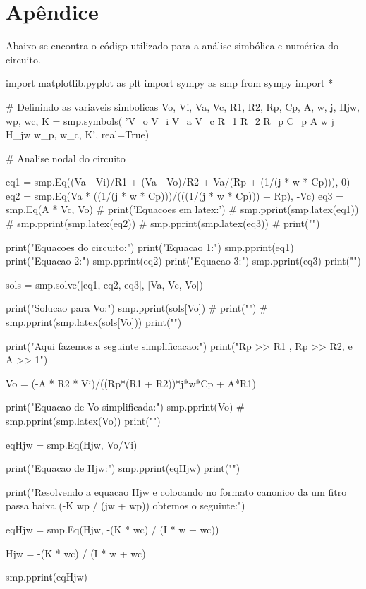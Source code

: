 \section{Apêndice}

Abaixo se encontra o código utilizado para a análise simbólica e numérica do circuito.

\begin{python}
    import matplotlib.pyplot as plt
    import sympy as smp
    from sympy import *

    # Definindo as variaveis simbolicas
    Vo, Vi, Va, Vc, R1, R2, Rp, Cp, A, w, j, Hjw, wp, wc, K = smp.symbols(
    'V_o V_i V_a V_c R_1 R_2 R_p C_p A w j H_jw w_p, w_c, K', real=True)

    # Analise nodal do circuito

    eq1 = smp.Eq((Va - Vi)/R1 + (Va - Vo)/R2 + Va/(Rp + (1/(j * w * Cp))), 0)
    eq2 = smp.Eq(Va * ((1/(j * w * Cp)))/(((1/(j * w * Cp))) + Rp), -Vc)
    eq3 = smp.Eq(A * Vc, Vo)
    # print('Equacoes em latex:')
    # smp.pprint(smp.latex(eq1))
    # smp.pprint(smp.latex(eq2))
    # smp.pprint(smp.latex(eq3))
    # print("")

    print("Equacoes do circuito:")
    print("Equacao 1:")
    smp.pprint(eq1)
    print("Equacao 2:")
    smp.pprint(eq2)
    print("Equacao 3:")
    smp.pprint(eq3)
    print("")

    sols = smp.solve([eq1, eq2, eq3], [Va, Vc, Vo])

    print("Solucao para Vo:")
    smp.pprint(sols[Vo])
    # print("")
    # smp.pprint(smp.latex(sols[Vo]))
    print("")

    print("Aqui fazemos a seguinte simplificacao:")
    print("Rp >> R1 , Rp >> R2, e A >> 1")

    Vo = (-A * R2 * Vi)/((Rp*(R1 + R2))*j*w*Cp + A*R1)

    print("Equacao de Vo simplificada:")
    smp.pprint(Vo)
    # smp.pprint(smp.latex(Vo))
    print("")

    eqHjw = smp.Eq(Hjw, Vo/Vi)

    print("Equacao de Hjw:")
    smp.pprint(eqHjw)
    print("")

    print("Resolvendo a equacao Hjw e colocando no formato canonico da um fitro passa baixa (-K wp / (jw + wp)) obtemos o seguinte:")

    eqHjw = smp.Eq(Hjw, -(K * wc) / (I * w + wc))

    Hjw = -(K * wc) / (I * w + wc)

    smp.pprint(eqHjw)


\end{python}
